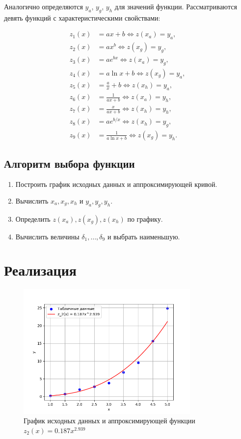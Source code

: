\documentclass[a4paper, 14pt]{extarticle}
\begin{document}
Аналогично определяются \( y_a \), \( y_g \), \( y_h \) для значений функции. Рассматриваются девять функций с характеристическими свойствами:

\[
\begin{aligned}
z_1(x) &= ax + b \iff z(x_a) = y_a, \\
z_2(x) &= ax^b \iff z(x_g) = y_g, \\
z_3(x) &= ae^{bx} \iff z(x_a) = y_g, \\
z_4(x) &= a\ln x + b \iff z(x_g) = y_a, \\
z_5(x) &= \frac{a}{x} + b \iff z(x_h) = y_a, \\
z_6(x) &= \frac{1}{ax + b} \iff z(x_a) = y_h, \\
z_7(x) &= \frac{x}{ax + b} \iff z(x_h) = y_h, \\
z_8(x) &= ae^{b/x} \iff z(x_h) = y_g, \\
z_9(x) &= \frac{1}{a\ln x + b} \iff z(x_g) = y_h.
\end{aligned}
\]

\subsection{Алгоритм выбора функции}
\begin{enumerate}
    \item Построить график исходных данных и аппроксимирующей кривой.
    \item Вычислить \( x_a, x_g, x_h \) и \( y_a, y_g, y_h \).
    \item Определить \( z(x_a), z(x_g), z(x_h) \) по графику.
    \item Вычислить величины \( \delta_1, \ldots, \delta_9 \) и выбрать наименьшую.
\end{enumerate}

\section{Реализация}




\begin{figure}[H]
    \centering
    \includegraphics[width=0.8\textwidth]{images/graph.png}
    \caption{График исходных данных и аппроксимирующей функции $z_2(x) = 0.187x^{2.939}$}
    \label{fig:graph}
\end{figure}
\end{document}
